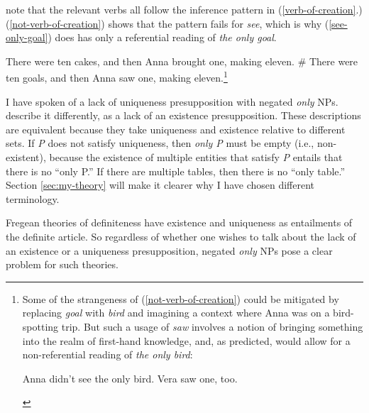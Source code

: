 \citet{cb2015} note that the relevant verbs all follow the inference pattern in (\ref{verb-of-creation}.) (\ref{not-verb-of-creation}) shows that the pattern fails for \textit{see}, which is why (\ref{see-only-goal}) does has only a referential reading of \textit{the only goal}.

\begin{exe}
	\ex \label{verb-of-creation} There were ten cakes, and then Anna brought one, making eleven.
	\ex \label{not-verb-of-creation} \# There were ten goals, and then Anna saw one, making eleven.\footnote{Some of the strangeness of (\ref{not-verb-of-creation}) could be mitigated by replacing \textit{goal} with \textit{bird} and imagining a context where Anna was on a bird-spotting trip. But such a usage of \textit{saw} involves a notion of bringing something into the realm of first-hand knowledge, and, as predicted, would allow for a non-referential reading of \textit{the only bird}: \begin{exe} \ex Anna didn't see the only bird. Vera saw one, too. \end{exe} }
\end{exe}

I have spoken of a lack of uniqueness presupposition with negated \textit{only} NPs. \citet{cb2015} describe it differently, as a lack of an existence presupposition. These descriptions are equivalent because they take uniqueness and existence relative to different sets. If \textit{P} does not satisfy uniqueness, then \textit{only P} must be empty (i.e., non-existent), because the existence of multiple entities that satisfy \textit{P} entails that there is no ``only P.'' If there are multiple tables, then there is no ``only table.'' Section \ref{sec:my-theory} will make it clearer why I have chosen different terminology.

Fregean theories of definiteness have existence and uniqueness as entailments of the definite article. So regardless of whether one wishes to talk about the lack of an existence or a uniqueness presupposition, negated \textit{only} NPs pose a clear problem for such theories.